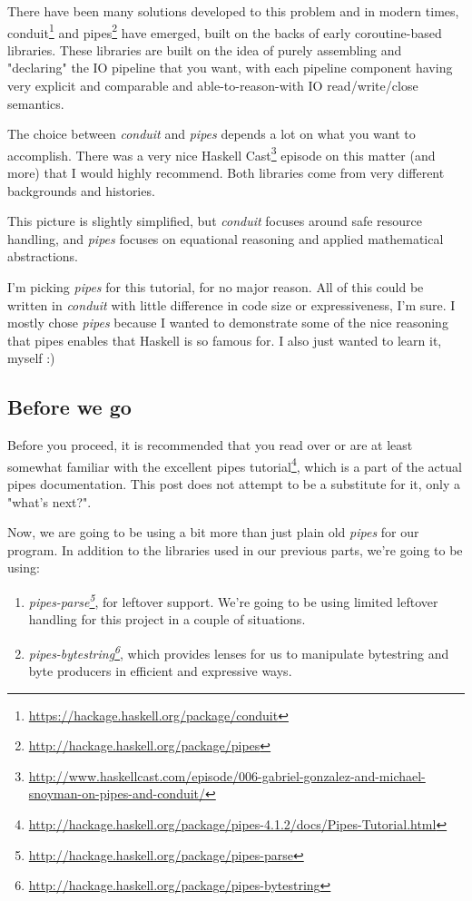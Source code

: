 \documentclass[]{article}
\renewcommand{\href}[2]{#2\footnote{\url{#1}}}
\begin{document}
There have been many solutions developed to this problem and in modern times,
\href{https://hackage.haskell.org/package/conduit}{conduit} and
\href{http://hackage.haskell.org/package/pipes}{pipes} have emerged, built on
the backs of early coroutine-based libraries. These libraries are built on the
idea of purely assembling and "declaring" the IO pipeline that you want, with
each pipeline component having very explicit and comparable and
able-to-reason-with IO read/write/close semantics.

The choice between \emph{conduit} and \emph{pipes} depends a lot on what you
want to accomplish. There was a very nice
\href{http://www.haskellcast.com/episode/006-gabriel-gonzalez-and-michael-snoyman-on-pipes-and-conduit/}{Haskell
Cast} episode on this matter (and more) that I would highly recommend. Both
libraries come from very different backgrounds and histories.

This picture is slightly simplified, but \emph{conduit} focuses around safe
resource handling, and \emph{pipes} focuses on equational reasoning and applied
mathematical abstractions.

I'm picking \emph{pipes} for this tutorial, for no major reason. All of this
could be written in \emph{conduit} with little difference in code size or
expressiveness, I'm sure. I mostly chose \emph{pipes} because I wanted to
demonstrate some of the nice reasoning that pipes enables that Haskell is so
famous for. I also just wanted to learn it, myself :)

\subsection{Before we go}

Before you proceed, it is recommended that you read over or are at least
somewhat familiar with the excellent
\href{http://hackage.haskell.org/package/pipes-4.1.2/docs/Pipes-Tutorial.html}{pipes
tutorial}, which is a part of the actual pipes documentation. This post does not
attempt to be a substitute for it, only a "what's next?".

Now, we are going to be using a bit more than just plain old \emph{pipes} for
our program. In addition to the libraries used in our previous parts, we're
going to be using:

\begin{enumerate}
\tightlist
\item
  \emph{\href{http://hackage.haskell.org/package/pipes-parse}{pipes-parse}}, for
  leftover support. We're going to be using limited leftover handling for this
  project in a couple of situations.
\item
  \emph{\href{http://hackage.haskell.org/package/pipes-bytestring}{pipes-bytestring}},
  which provides lenses for us to manipulate bytestring and byte producers in
  efficient and expressive ways.
\end{enumerate}
\end{document}
